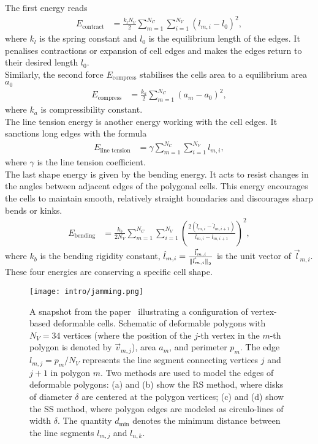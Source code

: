 The first energy reads
\begin{align*}
	E_{\text{contract}} &= \frac{k_l N_V}{2} \sum\limits_{m=1}^{N_C} \sum\limits_{i=1}^{N_V} (l_{m,i}-l_0)^2,
\end{align*}
where $k_l$ is the spring constant and $l_0$ is the equilibrium length of the edges. 
It penalises contractions or expansion of cell edges and makes the edges return to their desired length $l_0$. \\ 
Similarly, the second force $E_{\text{compress}}$ stabilises the cells area to a equilibrium area $a_0$ 
\begin{align*}
	E_{\text{compress}} &= \frac{k_a}{2} \sum\limits_{m=1}^{N_C} (a_m - a_0)^2, 
\end{align*}
where $k_a$ is compressibility constant. \\ 
The line tension energy is another energy working with the cell edges.
It sanctions long edges with the formula 
\begin{align*}
	E_{\text{line tension}} &= \gamma \sum\limits_{m=1}^{N_C} \sum\limits_{i=1}^{N_V} l_{m,i} ,
\end{align*}
where $\gamma$ is the line tension coefficient. \\
The last shape energy is given by the bending energy. 
It acts to resist changes in the angles between adjacent edges of the polygonal cells.
This energy encourages the cells to maintain smooth, relatively straight boundaries and discourages sharp bends or kinks.
\begin{align*}
	E_{\text{bending}} &= \frac{k_b}{2 N_V} \sum\limits_{m=1}^{N_C} \sum\limits_{i=1}^{N_V} \left( \frac{2( \hat{l}_{m,i} - \hat{l}_{m,i+1})}{l_{m,i} - l_{m,i+1}}  \right)^2 ,
\end{align*}
where $k_b$ is the bending rigidity constant, $\hat{l}_{m,i} = \frac{\vec{l}_{m,i}}{\norm[\vec{l}_{m,i}]} $ is the unit vector of $\vec{l}_{m,i}$.
These four energies are conserving a specific cell shape. \\
\begin{figure}[h!]
	\centering
	\texttt{[image: intro/jamming.png]}
	\caption{A snapshot from the paper~\cite{Boromand2018} illustrating a configuration of vertex-based deformable cells. 
	Schematic of deformable polygons with $N_V = 34$ vertices (where the position of the $j$-th vertex in the $m$-th polygon is denoted by $\vec{v}_{m,j}$), area $a_m$, and perimeter $p_m$. 
	The edge $l_{m,j} = p_m / N_V$ represents the line segment connecting vertices $j$ and $j+1$ in polygon $m$. 
	Two methods are used to model the edges of deformable polygons: (a) and (b) show the RS method, where disks of diameter $\delta$ are centered at the polygon vertices; (c) and (d) show the SS method, where polygon edges are modeled as circulo-lines of width $\delta$. 
	The quantity $d_{\text{min}}$ denotes the minimum distance between the line segments $l_{m,j}$ and $l_{n,k}$.
	}
	\label{fig:vertex}
\end{figure}
